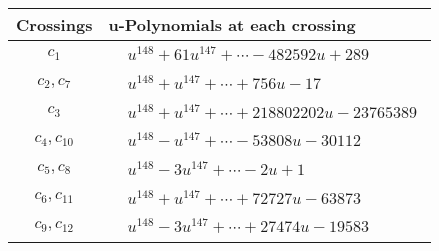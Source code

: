 \documentclass[1p]{elsarticle_modified}
\theoremstyle{definition}
\begin{document}
\begin{tabular}{m{50pt}|m{274pt}}
Crossings & \hspace{64pt}u-Polynomials at each crossing \\
\hline $$\begin{aligned}c_{1}\end{aligned}$$&$\begin{aligned}
&u^{148}+61 u^{147}+\cdots-482592 u+289
\end{aligned}$\\
\hline $$\begin{aligned}c_{2},c_{7}\end{aligned}$$&$\begin{aligned}
&u^{148}+u^{147}+\cdots+756 u-17
\end{aligned}$\\
\hline $$\begin{aligned}c_{3}\end{aligned}$$&$\begin{aligned}
&u^{148}+u^{147}+\cdots+218802202 u-23765389
\end{aligned}$\\
\hline $$\begin{aligned}c_{4},c_{10}\end{aligned}$$&$\begin{aligned}
&u^{148}- u^{147}+\cdots-53808 u-30112
\end{aligned}$\\
\hline $$\begin{aligned}c_{5},c_{8}\end{aligned}$$&$\begin{aligned}
&u^{148}-3 u^{147}+\cdots-2 u+1
\end{aligned}$\\
\hline $$\begin{aligned}c_{6},c_{11}\end{aligned}$$&$\begin{aligned}
&u^{148}+u^{147}+\cdots+72727 u-63873
\end{aligned}$\\
\hline $$\begin{aligned}c_{9},c_{12}\end{aligned}$$&$\begin{aligned}
&u^{148}-3 u^{147}+\cdots+27474 u-19583
\end{aligned}$\\
\hline
\end{tabular}\\~\\
\end{document}
